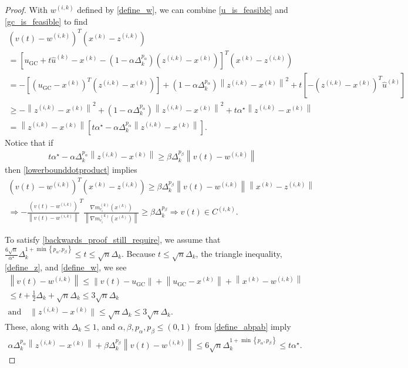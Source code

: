 \documentclass{article}
\theoremstyle{case}
\numberwithin{theorem}{subsection}
\newcommand{\dk}{\Delta_k}
\newcommand{\gmcik}{{\nabla m_{c_i}^{(k)}\left(\xk\right)}}
\newcommand{\huk}{{{\hat u}^{(k)}}}
\newcommand{\minanglealpha}{{ \alpha^{\star} }}
\newcommand{\minangledelta}{{\Delta_{\alpha^{\star}}}}
\newcommand{\wik}{{w^{(i, k)}}}
\newcommand{\xk}{x^{(k)}}
\newcommand{\zik}{{z^{(i, k)}}}
\newcommand{\fik}{{C^{(i, k)}}}
\begin{document}
\begin{proof}
With $\wik$ defined by \cref{define_w}, we can combine \cref{u_is_feasible} and \cref{gc_is_feasible} to find
\begin{align}
\left(v(t) - \wik \right)^T\left(\xk - \zik \right) \nonumber \\
=\left[ u_{\textrm{GC}} + t\huk - \xk - \left(1 - \alpha\dk^{p_{\alpha}}\right)\left(\zik - \xk\right) \right]^T\left(\xk - \zik \right) \nonumber \\
=- \left[
\left( u_{\textrm{GC}} - \xk\right)^T\left(\zik - \xk \right)
\right]
+\left(1 - \alpha\dk^{p_{\alpha}}\right)\left\|\zik - \xk\right\|^2
+ t\left[ -\left(\zik - \xk\right)^T\huk\right] \nonumber \\
\ge 
-\left\|\zik - \xk\right\|^2
+\left(1 - \alpha\dk^{p_{\alpha}}\right)\left\|\zik - \xk\right\|^2
+ t\minanglealpha \left\|\zik - \xk\right\| \nonumber \\
= \left\|\zik - \xk\right\|
\left[
t\minanglealpha
- \alpha\dk^{p_{\alpha}} \left\|\zik - \xk\right\|
\right]. \label{lowerbounddotproduct}
\end{align}
Notice that if
\begin{align}
t\minanglealpha - \alpha\dk^{p_{\alpha}} \left\|\zik - \xk\right\| \ge \beta \dk^{p_{\beta}} \left\|v(t) - \wik\right\| \label{backwards_proof_still_require}
\end{align}
then \cref{lowerbounddotproduct} implies
\begin{align*}
\left(v(t) - \wik \right)^T\left(\xk - \zik \right) \ge \beta \dk^{p_{\beta}}\left\|v(t) - \wik\right\| \left\|\xk - \zik\right\| \\
\Longrightarrow -\frac {\left(v(t) - \wik \right)}{\left\|v(t) - \wik \right\|}^T\frac{\gmcik}{\left\|\gmcik\right\|}\ge\beta \dk^{p_{\beta}} 
\Longrightarrow v(t) \in \fik.
\end{align*}

To satisfy \cref{backwards_proof_still_require}, we assume that 
$\frac{6 \sqrt{n}}{\minanglealpha} \dk^{1 + \min\left\{p_{\alpha}, p_{\beta}\right\}} \le t \le \sqrt{n}\dk$.
Because $t \le \sqrt{n} \dk$, the triangle inequality, \cref{define_z}, and \cref{define_w}, we see
\begin{align*}
\left\|v(t) - \wik\right\| \le \left\|v(t) - u_{\textrm{GC}}\right\| + \left\|u_{\textrm{GC}} - \xk \right\| + \left\|\xk - \wik\right\| \\
\le t + \frac 1 2 \dk + \sqrt{n}\dk 
\le 3\sqrt{n}\dk  \\
\textrm{and} \quad \|\zik - \xk \| \le \sqrt{n}\dk \le 3\sqrt{n}\dk.
\end{align*}
These, along with $\dk \le 1$, and $\alpha, \beta, p_{\alpha}, p_{\beta} \le (0, 1)$ from \cref{define_abpab} imply
\begin{align*}
\alpha\dk^{p_{\alpha}} \left\|\zik - \xk\right\| + \beta \dk^{p_{\beta}} \left\|v(t) - \wik\right\| 
\le 6 \sqrt{n} \dk^{1 + \min\left\{p_{\alpha}, p_{\beta}\right\}} \le t \minanglealpha.
\end{align*}


\end{proof}
\end{document}
